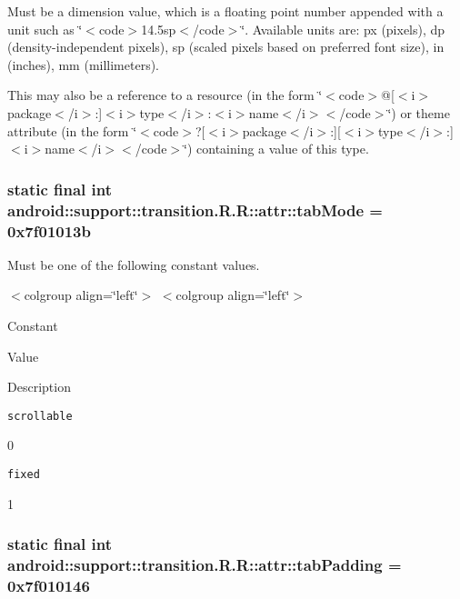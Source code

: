 Must be a dimension value, which is a floating point number appended with a unit such as \char`\"{}$<$code$>$14.5sp$<$/code$>$\char`\"{}. Available units are: px (pixels), dp (density-independent pixels), sp (scaled pixels based on preferred font size), in (inches), mm (millimeters). 

This may also be a reference to a resource (in the form \char`\"{}$<$code$>$@\mbox{[}$<$i$>$package$<$/i$>$:\mbox{]}$<$i$>$type$<$/i$>$:$<$i$>$name$<$/i$>$$<$/code$>$\char`\"{}) or theme attribute (in the form \char`\"{}$<$code$>$?\mbox{[}$<$i$>$package$<$/i$>$:\mbox{]}\mbox{[}$<$i$>$type$<$/i$>$:\mbox{]}$<$i$>$name$<$/i$>$$<$/code$>$\char`\"{}) containing a value of this type. \hypertarget{classandroid_1_1support_1_1transition_1_1_r_1_1attr_90e6933dd107aa0775e2598220a5488a}{
\subsubsection[{tabMode}]{\setlength{\rightskip}{0pt plus 5cm}static final int android::support::transition.R.R::attr::tabMode = 0x7f01013b}}
\label{classandroid_1_1support_1_1transition_1_1_r_1_1attr_90e6933dd107aa0775e2598220a5488a}


Must be one of the following constant values. \begin{TabularC}{0}
\hline
\end{TabularC}
$<$colgroup align=\char`\"{}left\char`\"{}$>$ $<$colgroup align=\char`\"{}left\char`\"{}$>$ 

Constant

Value

Description 

{\tt scrollable}

0

{\tt fixed}

1\hypertarget{classandroid_1_1support_1_1transition_1_1_r_1_1attr_5c67470e1f70ca079dc1f5b58eec6c9c}{
\subsubsection[{tabPadding}]{\setlength{\rightskip}{0pt plus 5cm}static final int android::support::transition.R.R::attr::tabPadding = 0x7f010146}}
\label{classandroid_1_1support_1_1transition_1_1_r_1_1attr_5c67470e1f70ca079dc1f5b58eec6c9c}


